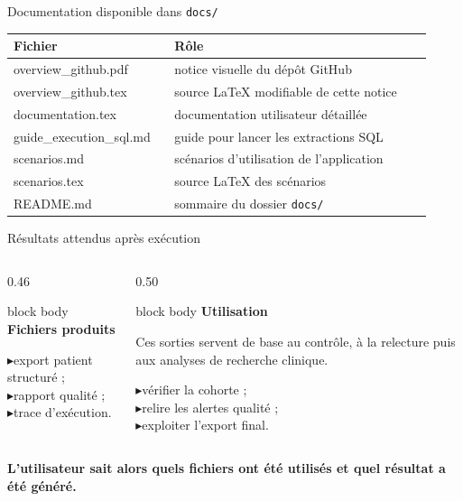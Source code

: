 \documentclass[10pt,aspectratio=169]{beamer}
\newcommand{\smallbullet}{\textcolor{MainBlue}{$\blacktriangleright$}\hspace{0.4em}}
\newenvironment{infobox}[1]
{\begin{beamercolorbox}[rounded=true,shadow=false,wd=\linewidth,sep=0.8em]{block body}
\textbf{\color{DarkBlue}#1}\par\vspace{0.3em}}
{\end{beamercolorbox}}
\begin{document}
\begin{frame}{Documentation disponible dans \texttt{docs/}}
\small
\begin{tabular}{>{\ttfamily}p{0.34\linewidth} p{0.58\linewidth}}
\toprule
\textbf{Fichier} & \textbf{Rôle}\\
\midrule
overview\_github.pdf & notice visuelle du dépôt GitHub\\
overview\_github.tex & source LaTeX modifiable de cette notice\\
documentation.tex & documentation utilisateur détaillée\\
guide\_execution\_sql.md & guide pour lancer les extractions SQL\\
scenarios.md & scénarios d'utilisation de l'application\\
scenarios.tex & source LaTeX des scénarios\\
README.md & sommaire du dossier \texttt{docs/}\\
\bottomrule
\end{tabular}
\end{frame}

\begin{frame}{Résultats attendus après exécution}
\begin{columns}[T,onlytextwidth]
\begin{column}{0.46\linewidth}
\begin{infobox}{Fichiers produits}
\smallbullet export patient structuré ;\\
\smallbullet rapport qualité ;\\
\smallbullet trace d'exécution.
\end{infobox}
\end{column}

\begin{column}{0.50\linewidth}
\begin{infobox}{Utilisation}
Ces sorties servent de base au contrôle, à la relecture puis aux analyses de recherche clinique.

\vspace{0.4em}
\smallbullet vérifier la cohorte ;\\
\smallbullet relire les alertes qualité ;\\
\smallbullet exploiter l'export final.
\end{infobox}
\end{column}
\end{columns}

\vfill
\centering
\textbf{L'utilisateur sait alors quels fichiers ont été utilisés et quel résultat a été généré.}
\end{frame}
\end{document}
